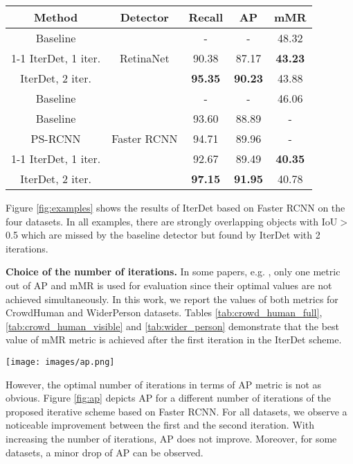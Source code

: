 \documentclass[runningheads]{llncs}
\begin{document}
\begin{table*}[h!]
    \centering
    \begin{tabular}{c|c|ccc}
        \hline
        Method & Detector & Recall & AP & mMR  \\ \hline \hline
        Baseline \cite{zhang2019widerperson} & \multirow{3}{*}{RetinaNet} & - & - & 48.32 \\ \cline{1-1} \cline{3-5}
        IterDet, 1 iter. && 90.38 & 87.17 & \textbf{43.23} \\
        IterDet, 2 iter. && \textbf{95.35} & \textbf{90.23} & 43.88 \\ \hline \hline
        Baseline \cite{zhang2019widerperson} & \multirow{5}{*}{Faster RCNN} & - & - & 46.06 \\
        Baseline \cite{ge2020ps} && 93.60 & 88.89 & - \\
        PS-RCNN \cite{ge2020ps} && 94.71 & 89.96 & - \\ \cline{1-1} \cline{3-5}
        IterDet, 1 iter. && 92.67 & 89.49 & \textbf{40.35} \\
        IterDet, 2 iter. && \textbf{97.15} & \textbf{91.95} & 40.78 \\ \hline
    \end{tabular}
    \caption{Experimental results on WiderPerson dataset.}
    \label{tab:wider_person}
\end{table*}

Figure \ref{fig:examples} shows the results of IterDet based on Faster RCNN on the four datasets. In all examples, there are strongly overlapping objects with IoU$>$0.5 which are missed by the baseline detector but found by IterDet with 2 iterations.

\textbf{Choice of the number of iterations.} In some papers, e.g. \cite{ge2020ps}, only one metric out of AP and mMR is used for evaluation since their optimal values are not achieved simultaneously. In this work, we report the values of both metrics for CrowdHuman and WiderPerson datasets. Tables \ref{tab:crowd_human_full}, \ref{tab:crowd_human_visible} and \ref{tab:wider_person} demonstrate that the best value of mMR metric is achieved after the first iteration in the IterDet scheme. 

\begin{figure*}[h!]
    \begin{center}
        \texttt{[image: images/ap.png]}
    \caption{AP for different number of iterations for IterDet based on Faster RCNN.}
    \label{fig:ap}
    \end{center}
\end{figure*}
However, the optimal number of iterations in terms of AP metric is not as obvious. Figure \ref{fig:ap} depicts AP for a different number of iterations of the proposed iterative scheme based on Faster RCNN. For all datasets, we observe a noticeable improvement between the first and the second iteration. With increasing the number of iterations, AP does not improve. Moreover, for some datasets, a minor drop of AP can be observed. \\
\end{document}
